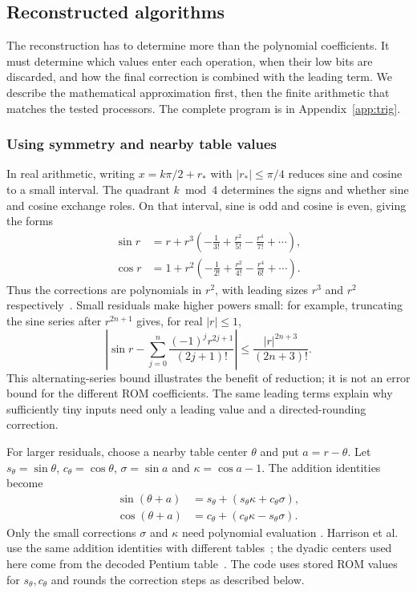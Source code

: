 \documentclass[11pt]{article}
\begin{document}
\subsection{Reconstructed algorithms}
\label{sec:trig}

The reconstruction has to determine more than the polynomial coefficients.
It must determine which values enter each operation, when their low bits are
discarded, and how the final correction is combined with the leading term.
We describe the mathematical approximation first, then the finite arithmetic
that matches the tested processors. The complete program is in
Appendix~\ref{app:trig}.


\subsubsection{Using symmetry and nearby table values}

In real arithmetic, writing $x=k\pi/2+r_*$ with $|r_*|\leq\pi/4$ reduces
sine and cosine to a small interval. The quadrant $k\bmod4$ determines the
signs and whether sine and cosine exchange roles. On that interval, sine is odd and cosine is even, giving the forms
\begin{align}
 \sin r&=r+r^3\left(-\frac1{3!}+\frac{r^2}{5!}
                                  -\frac{r^4}{7!}+\cdots\right),\\
 \cos r&=1+r^2\left(-\frac1{2!}+\frac{r^2}{4!}
                                  -\frac{r^4}{6!}+\cdots\right).
\end{align}
Thus the corrections are polynomials in $r^2$, with leading sizes $r^3$
and $r^2$ respectively~\cite[Section~4.19]{dlmfElementary}. Small residuals
make higher powers small: for example, truncating the sine series after
$r^{2n+1}$ gives, for real $|r|\leq1$,
\begin{equation}
 \left|\sin r-\sum_{j=0}^{n}\frac{(-1)^j r^{2j+1}}{(2j+1)!}\right|
 \leq\frac{|r|^{2n+3}}{(2n+3)!}.
\end{equation}
This alternating-series bound illustrates the benefit of reduction; it is
not an error bound for the different ROM coefficients. The same leading
terms explain why sufficiently tiny inputs need only a leading value and
a directed-rounding correction.

For larger residuals, choose a nearby table center $\theta$ and put
$a=r-\theta$. Let $s_\theta=\sin\theta$, $c_\theta=\cos\theta$,
$\sigma=\sin a$ and $\kappa=\cos a-1$. The addition identities become
\begin{align}
 \sin(\theta+a)&=s_\theta+(s_\theta\kappa+c_\theta\sigma),\\
 \cos(\theta+a)&=c_\theta+(c_\theta\kappa-s_\theta\sigma).
\end{align}
Only the small corrections $\sigma$ and $\kappa$ need polynomial evaluation
\cite[Section~4.21]{dlmfElementary}. Harrison et al. use the same addition
identities with different tables~\cite[p.~3]{harrison1999}; the dyadic centers
used here come from the decoded Pentium table~\cite{shirriff2025rom}.
The code uses stored ROM values for $s_\theta,c_\theta$ and rounds the
correction steps as described below.
\end{document}

